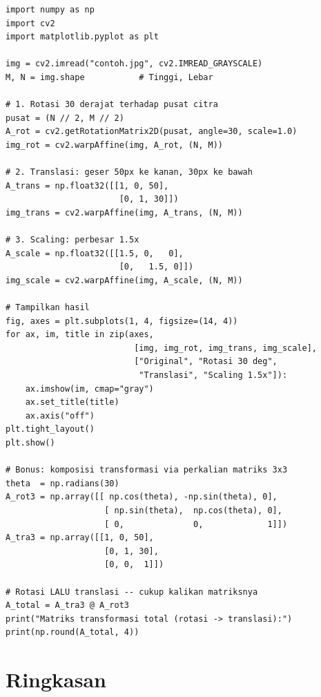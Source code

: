 \documentclass[12pt,a4paper]{article}
\begin{document}
\begin{lstlisting}[caption={Transformasi Affine: rotasi, translasi, dan scaling},
                   label={lst:affine}]
import numpy as np
import cv2
import matplotlib.pyplot as plt
 
img = cv2.imread("contoh.jpg", cv2.IMREAD_GRAYSCALE)
M, N = img.shape           # Tinggi, Lebar
 
# 1. Rotasi 30 derajat terhadap pusat citra
pusat = (N // 2, M // 2)
A_rot = cv2.getRotationMatrix2D(pusat, angle=30, scale=1.0)
img_rot = cv2.warpAffine(img, A_rot, (N, M))
 
# 2. Translasi: geser 50px ke kanan, 30px ke bawah
A_trans = np.float32([[1, 0, 50],
                       [0, 1, 30]])
img_trans = cv2.warpAffine(img, A_trans, (N, M))
 
# 3. Scaling: perbesar 1.5x
A_scale = np.float32([[1.5, 0,   0],
                       [0,   1.5, 0]])
img_scale = cv2.warpAffine(img, A_scale, (N, M))
 
# Tampilkan hasil
fig, axes = plt.subplots(1, 4, figsize=(14, 4))
for ax, im, title in zip(axes,
                          [img, img_rot, img_trans, img_scale],
                          ["Original", "Rotasi 30 deg",
                           "Translasi", "Scaling 1.5x"]):
    ax.imshow(im, cmap="gray")
    ax.set_title(title)
    ax.axis("off")
plt.tight_layout()
plt.show()
 
# Bonus: komposisi transformasi via perkalian matriks 3x3
theta  = np.radians(30)
A_rot3 = np.array([[ np.cos(theta), -np.sin(theta), 0],
                    [ np.sin(theta),  np.cos(theta), 0],
                    [ 0,              0,             1]])
A_tra3 = np.array([[1, 0, 50],
                    [0, 1, 30],
                    [0, 0,  1]])
 
# Rotasi LALU translasi -- cukup kalikan matriksnya
A_total = A_tra3 @ A_rot3
print("Matriks transformasi total (rotasi -> translasi):")
print(np.round(A_total, 4))
\end{lstlisting}
 
\section*{Ringkasan}
 
\end{document}
